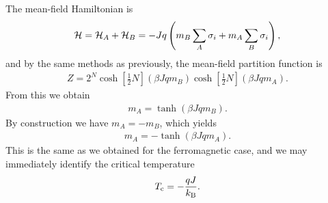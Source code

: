 The mean-field Hamiltonian is
\begin{align*}
	\mathcal{H} = \mathcal{H}_{A} + \mathcal{H}_{B} = -Jq\left(m_{B}\sum\limits_{A}\sigma_{i} + m_{A}\sum\limits_{B}\sigma_{i}\right),
\end{align*}
and by the same methods as previously, the mean-field partition function is
\begin{align*}
	Z = 2^{N}\cosh[\frac{1}{2}N](\beta Jqm_{B})\cosh[\frac{1}{2}N](\beta Jqm_{A}).
\end{align*}
From this we obtain
\begin{align*}
	m_{A} = \tanh(\beta Jqm_{B}).
\end{align*}
By construction we have $m_{A} = -m_{B}$, which yields
\begin{align*}
	m_{A} = -\tanh(\beta Jqm_{A}).
\end{align*}
This is the same as we obtained for the ferromagnetic case, and we may immediately identify the critical temperature
\begin{align*}
	T_{\text{c}} = -\frac{qJ}{k_{\text{B}}}.
\end{align*}